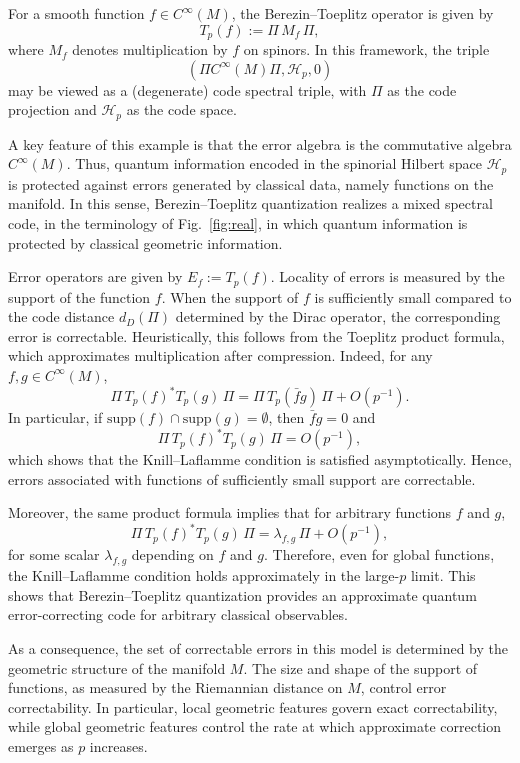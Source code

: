 \documentclass[12pt]{article}
\theoremstyle{definition} %
\theoremstyle{plain} %
\theoremstyle{remark} %
\theoremstyle{underline}
\begin{document}
For a smooth function $f\in C^\infty(M)$, the Berezin--Toeplitz operator is given by
\[
    T_p(f) := \Pi\, M_f\, \Pi,
\]
where $M_f$ denotes multiplication by $f$ on spinors.
In this framework, the triple
\[
    (\Pi C^\infty(M)\Pi,\mathcal H_p,0)
\]
may be viewed as a (degenerate) code spectral triple, with $\Pi$ as the code projection and $\mathcal H_p$ as the code space.

A key feature of this example is that the error algebra is the commutative algebra $C^\infty(M)$.
Thus, quantum information encoded in the spinorial Hilbert space $\mathcal H_p$ is protected against errors generated by classical data, namely functions on the manifold.
In this sense, Berezin--Toeplitz quantization realizes a mixed spectral code, in the terminology of Fig.~\ref{fig:real}, in which quantum information is protected by classical geometric information.

Error operators are given by $E_f := T_p(f)$.
Locality of errors is measured by the support of the function $f$.
When the support of $f$ is sufficiently small compared to the code distance $d_{D}(\Pi)$ determined by the Dirac operator, the corresponding error is correctable.
Heuristically, this follows from the Toeplitz product formula, which approximates multiplication after compression.
Indeed, for any $f,g\in C^\infty(M)$,
\[
    \Pi\, T_p(f)^* T_p(g)\, \Pi=
    \Pi\, T_p(\bar f g)\, \Pi
    +
    O(p^{-1}).
\]
In particular, if $\mathrm{supp}(f)\cap\mathrm{supp}(g)=\emptyset$, then $\bar f g=0$ and
\[
    \Pi\, T_p(f)^* T_p(g)\, \Pi
    =
    O(p^{-1}),
\]
which shows that the Knill--Laflamme condition is satisfied asymptotically.
Hence, errors associated with functions of sufficiently small support are correctable.

Moreover, the same product formula implies that for arbitrary functions $f$ and $g$,
\[
    \Pi\, T_p(f)^* T_p(g)\, \Pi
    =
    \lambda_{f,g}\,\Pi + O(p^{-1}),
\]
for some scalar $\lambda_{f,g}$ depending on $f$ and $g$.
Therefore, even for global functions, the Knill--Laflamme condition holds approximately in the large-$p$ limit.
This shows that Berezin--Toeplitz quantization provides an approximate quantum error-correcting code for arbitrary classical observables.

As a consequence, the set of correctable errors in this model is determined by the geometric structure of the manifold $M$.
The size and shape of the support of functions, as measured by the Riemannian distance on $M$, control error correctability.
In particular, local geometric features govern exact correctability, while global geometric features control the rate at which approximate correction emerges as $p$ increases.
\end{document}
